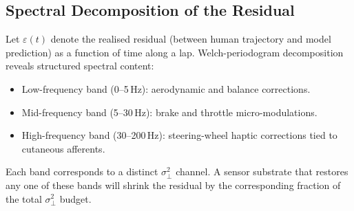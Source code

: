 \documentclass[11pt,twocolumn]{article}
\theoremstyle{definition}
\theoremstyle{remark}
\begin{document}
\subsection{Spectral Decomposition of the Residual}

Let $\varepsilon(t)$ denote the realised residual (between human trajectory and model prediction) as a function of time along a lap. Welch-periodogram decomposition reveals structured spectral content:
\begin{itemize}[leftmargin=*,itemsep=2pt]
\item Low-frequency band (0--5\,Hz): aerodynamic and balance corrections.
\item Mid-frequency band (5--30\,Hz): brake and throttle micro-modulations.
\item High-frequency band (30--200\,Hz): steering-wheel haptic corrections tied to cutaneous afferents.
\end{itemize}

Each band corresponds to a distinct $\sigma^2_{\perp}$ channel. A sensor substrate that restores any one of these bands will shrink the residual by the corresponding fraction of the total $\sigma^2_{\perp}$ budget.
\end{document}
